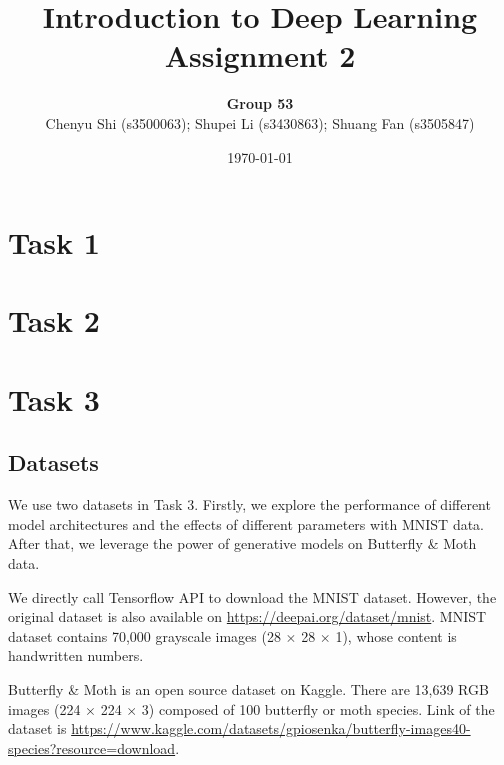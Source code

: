 \documentclass{article}
\title{Introduction to Deep Learning\\Assignment 2} %
\author{\textbf{Group 53}\\Chenyu Shi (s3500063); Shupei Li (s3430863); Shuang Fan (s3505847)} %
\date{\today} %
\begin{document}

\maketitle %

\section*{Task 1}

\section*{Task 2}

\section*{Task 3}
\setcounter{section}{3}
\subsection{Datasets}
We use two datasets in Task 3. Firstly, we explore the performance of different model architectures and the effects of different parameters with MNIST data. After that, we leverage the power of generative models on Butterfly \& Moth data. \par
We directly call Tensorflow API to download the MNIST dataset. However, the original dataset is also available on \url{https://deepai.org/dataset/mnist}. MNIST dataset contains 70,000 grayscale images (28 $\times$ 28 $\times$ 1), whose content is handwritten numbers. \par
Butterfly \& Moth is an open source dataset on Kaggle. There are 13,639 RGB images (224 $\times$ 224 $\times$ 3) composed of 100 butterfly or moth species. Link of the dataset is \url{https://www.kaggle.com/datasets/gpiosenka/butterfly-images40-species?resource=download}.
\end{document}
